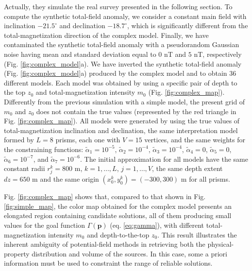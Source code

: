 Actually, they simulate the real survey presented in the following section. To compute the synthetic total-field anomaly, we consider a constant main field with inclination $ -21.5^\circ $ and declination $ -18.7^\circ $, which is significantly different from the total-magnetization direction of the complex model. Finally, we have
contaminated the synthetic total-field anomaly with a pseudorandom Gaussian noise having mean and standard deviation equal to $0$ nT and $5$ nT, respectively (Fig. \ref{fig:complex_model}a). We have inverted the synthetic total-field anomaly (Fig. \ref{fig:complex_model}a) produced by the complex model and to obtain 36 different models. Each model was obtained by using a specific pair of depth to the top $ z_0 $
and total-magnetization intensity $ m_0 $ (Fig. \ref{fig:complex_map}). Differently from the previous simulation with a simple model, the present grid of $ m_0 $ and $ z_0 $ does not contain the true values (represented by the red triangle in Fig. \ref{fig:complex_map}). All models were generated by using the true values of total-magnetization inclination and declination, the same interpretation model formed by $ L = 8 $ prisms, each one with $ V = 15 $ vertices, and the same weights for the constraining functions: $\tilde{\alpha}_1 = 10^{-5}$, $\tilde{\alpha}_2 = 10^{-4}$, $\tilde{\alpha}_3 = 10^{-4}$, $\tilde{\alpha}_4 = 0$, $\tilde{\alpha}_5 = 0$, $\tilde{\alpha}_6 = 10^{-7}$, and $\tilde{\alpha}_7 = 10^{-6}$. The initial approximation for all models have the same constant radii $ r^k_j = 800 $ m, $ k = 1, \dots, L $, $ j = 1, \dots, V $, the same depth extent $ dz = 650 $ m and the same origin $ (x^k_0, y^k_0) = (-300, 300) $ m for all prisms.

Fig. \ref{fig:complex_map} shows that, compared to that shown in 
Fig. \ref{fig:simple_map}, the color map obtained for the complex model 
presents an elongated region containing candidate solutions, all of them 
producing small values for the goal function $ \Gamma(\mathbf{p}) $ (eq. \ref{eq:gamma}),
with different total-magnetization intensity $ m_0 $ and depth-to-the-top $z_0$. 
This result illustrates the inherent ambiguity of potential-field methods in 
retrieving both the physical-property distribution and volume of the sources. 
In this case, some a priori information must 
be used to constraint the range of reliable solutions.

